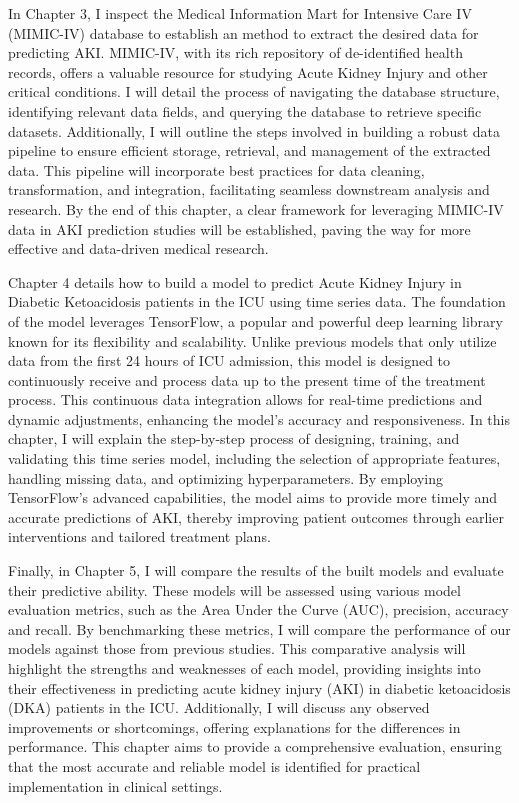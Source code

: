 \documentclass[../main.tex]{subfiles}
\begin{document}
In Chapter 3, I inspect the Medical Information Mart for Intensive Care IV (MIMIC-IV) database to establish an method to extract the desired data for predicting AKI. 
MIMIC-IV, with its rich repository of de-identified health records, offers a valuable resource for studying Acute Kidney Injury and other critical conditions. 
I will detail the process of navigating the database structure, identifying relevant data fields, and querying the database to retrieve specific datasets. 
Additionally, I will outline the steps involved in building a robust data pipeline to ensure efficient storage, retrieval, and management of the extracted data. 
This pipeline will incorporate best practices for data cleaning, transformation, and integration, facilitating seamless downstream analysis and research. 
By the end of this chapter, a clear framework for leveraging MIMIC-IV data in AKI prediction studies will be established, paving the way for more effective and data-driven medical research.

Chapter 4 details how to build a model to predict Acute Kidney Injury in Diabetic Ketoacidosis patients in the ICU using time series data. 
The foundation of the model leverages TensorFlow, a popular and powerful deep learning library known for its flexibility and scalability. 
Unlike previous models that only utilize data from the first 24 hours of ICU admission, this model is designed to continuously receive and process data up to the present time of the treatment process. 
This continuous data integration allows for real-time predictions and dynamic adjustments, enhancing the model's accuracy and responsiveness. 
In this chapter, I will explain the step-by-step process of designing, training, and validating this time series model, including the selection of appropriate features, handling missing data, and optimizing hyperparameters. 
By employing TensorFlow's advanced capabilities, the model aims to provide more timely and accurate predictions of AKI, thereby improving patient outcomes through earlier interventions and tailored treatment plans.

Finally, in Chapter 5, I will compare the results of the built models and evaluate their predictive ability. 
These models will be assessed using various model evaluation metrics, such as the Area Under the Curve (AUC), precision, accuracy and recall. 
By benchmarking these metrics, I will compare the performance of our models against those from previous studies. 
This comparative analysis will highlight the strengths and weaknesses of each model, providing insights into their effectiveness in predicting acute kidney injury (AKI) in diabetic ketoacidosis (DKA) patients in the ICU. 
Additionally, I will discuss any observed improvements or shortcomings, offering explanations for the differences in performance. 
This chapter aims to provide a comprehensive evaluation, ensuring that the most accurate and reliable model is identified for practical implementation in clinical settings.
\end{document}

